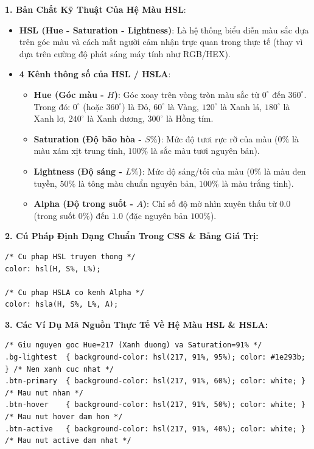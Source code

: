 \begin{conceptBox}
\textbf{1. Bản Chất Kỹ Thuật Của Hệ Màu HSL}:
\begin{itemize}[leftmargin=1.5em, itemsep=3pt, parsep=0pt]
    \item \textbf{HSL (Hue - Saturation - Lightness)}: Là hệ thống biểu diễn màu sắc dựa trên góc màu và cách mắt người cảm nhận trực quan trong thực tế (thay vì dựa trên cường độ phát sáng máy tính như RGB/HEX).
    \item \textbf{4 Kênh thông số của HSL / HSLA}:
    \begin{itemize}[leftmargin=1.2em, itemsep=2pt]
        \item \textbf{Hue (Góc màu - $H$)}: Góc xoay trên vòng tròn màu sắc từ $0^\circ$ đến $360^\circ$. Trong đó: $0^\circ$ (hoặc $360^\circ$) là Đỏ, $60^\circ$ là Vàng, $120^\circ$ là Xanh lá, $180^\circ$ là Xanh lơ, $240^\circ$ là Xanh dương, $300^\circ$ là Hồng tím.
        \item \textbf{Saturation (Độ bão hòa - $S\%$)}: Mức độ tươi rực rỡ của màu ($0\%$ là màu xám xịt trung tính, $100\%$ là sắc màu tươi nguyên bản).
        \item \textbf{Lightness (Độ sáng - $L\%$)}: Mức độ sáng/tối của màu ($0\%$ là màu đen tuyền, $50\%$ là tông màu chuẩn nguyên bản, $100\%$ là màu trắng tinh).
        \item \textbf{Alpha (Độ trong suốt - $A$)}: Chỉ số độ mờ nhìn xuyên thấu từ $0.0$ (trong suốt $0\%$) đến $1.0$ (đặc nguyên bản $100\%$).
    \end{itemize}
\end{itemize}
\end{conceptBox}

\textbf{2. Cú Pháp Định Dạng Chuẩn Trong CSS \& Bảng Giá Trị:}

\begin{codeWindow}
\begin{lstlisting}[language=CSS3]
/* Cu phap HSL truyen thong */
color: hsl(H, S%, L%);

/* Cu phap HSLA co kenh Alpha */
color: hsla(H, S%, L%, A);
\end{lstlisting}
\end{codeWindow}

\textbf{3. Các Ví Dụ Mã Nguồn Thực Tế Về Hệ Màu HSL \& HSLA:}

\begin{codeWindow}
\begin{lstlisting}[language=CSS3]
/* Giu nguyen goc Hue=217 (Xanh duong) va Saturation=91% */
.bg-lightest  { background-color: hsl(217, 91%, 95%); color: #1e293b; } /* Nen xanh cuc nhat */
.btn-primary  { background-color: hsl(217, 91%, 60%); color: white; }   /* Mau nut nhan */
.btn-hover    { background-color: hsl(217, 91%, 50%); color: white; }   /* Mau nut hover dam hon */
.btn-active   { background-color: hsl(217, 91%, 40%); color: white; }   /* Mau nut active dam nhat */
\end{lstlisting}
\end{codeWindow}

